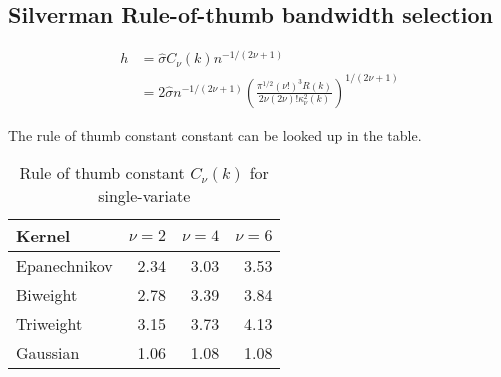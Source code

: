 \documentclass{article}
\def\tbf{\textbf}
\begin{document}
\subsection{Silverman Rule-of-thumb bandwidth selection}
\[ \begin{split}
h & =  \hat{\sigma} C_\nu(k) n^{-1/(2\nu+1)}  \\
 & = 2 \hat{\sigma} n^{-1/(2\nu+1)} \left( \frac{\pi^{1/2}(\nu!)^3 R(k)}{2\nu(2\nu)! \kappa_\nu^2(k)} \right)^{1/(2\nu+1)} \end{split}\]

The rule of thumb constant constant can be looked up in the table.
\begin{table}[!htbp]
  \begin{centering}
    \caption{Rule of thumb constant $C_\nu(k)$ for single-variate}
  \begin{tabular}{lrrr}
    \hline \hline
    \tbf{Kernel} & $\nu = 2$ & $\nu = 4$ & $\nu = 6$ \\
    \hline
    Epanechnikov & 2.34 & 3.03 & 3.53 \\
    Biweight & 2.78 & 3.39 & 3.84 \\
    Triweight & 3.15 & 3.73 & 4.13 \\
    Gaussian & 1.06 & 1.08 & 1.08 \\ \hline
  \end{tabular}
  \end{centering}
\end{table}



\end{document}
